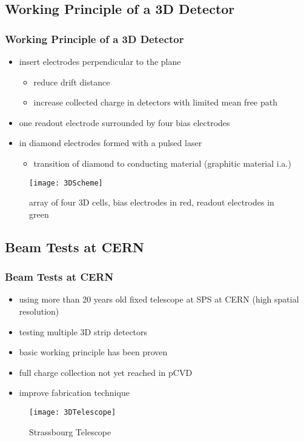 \subsection{Working Principle of a 3D Detector}
\begin{frame}
	\frametitle{Working Principle of a 3D Detector}
	\begin{itemize}
		\setlength{\itemsep}{\fill}
		\item insert electrodes perpendicular to the plane
		\begin{itemize}
			\item reduce drift distance
			\item increase collected charge in detectors with limited mean free path %
		\end{itemize}
		\item one readout electrode surrounded by four bias electrodes
		\item in diamond electrodes formed with a pulsed laser
		\begin{itemize}
			\item transition of diamond to conducting material (graphitic material i.a.)
		\end{itemize}
	\end{itemize}
	\begin{figure}
		\centering
		\texttt{[image: 3DScheme]}
		\caption{array of four 3D cells, bias electrodes in red, readout electrodes in green}
	\end{figure}
\end{frame}
\subsection{Beam Tests at CERN}
\begin{frame}
	\frametitle{Beam Tests at CERN}
	\begin{itemize}
		\setlength{\itemsep}{\fill}
		\item using more than 20 years old fixed telescope at SPS at CERN (high spatial resolution)
		\item testing multiple 3D strip detectors
		\item basic working principle has been proven
		\item full charge collection not yet reached in pCVD
		\item improve fabrication technique
	\end{itemize}
	\begin{figure}
		\centering
		\texttt{[image: 3DTelescope]}
		\caption{Strassbourg Telescope}
	\end{figure}
\end{frame}